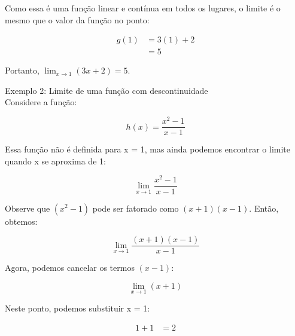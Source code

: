 \documentclass{article}
\begin{document}
\begin{enumerate}
    Como essa é uma função linear e contínua em todos os lugares, o limite é o mesmo que o valor da função no ponto:
    
    \begin{align*}
        g(1) &= 3(1) + 2 \\
        &= 5
    \end{align*}
    
    Portanto, $\lim_{x \to 1} (3x + 2) = 5$.

    \begin{center}
    \end{center}
    
    Exemplo 2: Limite de uma função com descontinuidade \\
    Considere a função:
    
    \begin{equation*}
        h(x) = \frac{x^2 - 1}{x - 1}
    \end{equation*}
    
    Essa função não é definida para x = 1, mas ainda podemos encontrar o limite quando x se aproxima de 1:
    
    \begin{equation*}
        \lim_{x \to 1} \frac{x^2 - 1}{x - 1}
    \end{equation*}
    
    Observe que $(x^2 - 1)$ pode ser fatorado como $(x + 1)(x - 1)$. Então, obtemos:
    
    \begin{equation*}
        \lim_{x \to 1} \frac{(x + 1)(x - 1)}{x - 1}
    \end{equation*}
    
    Agora, podemos cancelar os termos $(x - 1)$:
    
    \begin{equation*}
        \lim_{x \to 1} (x + 1)
    \end{equation*}
    
    Neste ponto, podemos substituir x = 1:

    \begin{align*}
        1 + 1 &= 2
    \end{align*}
    

\end{enumerate}
\end{document}
